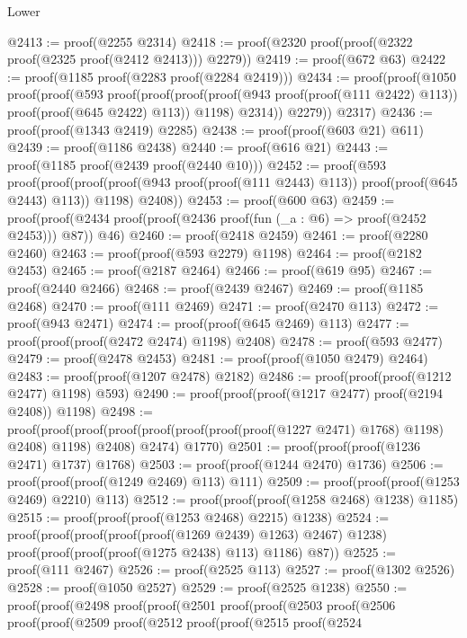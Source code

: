 \begin{lexlean}{Lower}
\begin{coremodule}
@2413 := proof(@2255 @2314)
@2418 := proof(@2320 proof(proof(@2322 proof(@2325 proof(@2412 @2413))) @2279))
@2419 := proof(@672 @63)
@2422 := proof(@1185 proof(@2283 proof(@2284 @2419)))
@2434 := proof(proof(@1050
        proof(proof(@593
              proof(proof(proof(proof(@943 proof(proof(@111 @2422) @113))
                      proof(proof(@645 @2422) @113))
                    @1198)
                  @2314))
            @2279))
      @2317)
@2436 := proof(proof(@1343 @2419) @2285)
@2438 := proof(proof(@603 @21) @611)
@2439 := proof(@1186 @2438)
@2440 := proof(@616 @21)
@2443 := proof(@1185 proof(@2439 proof(@2440 @10)))
@2452 := proof(@593
      proof(proof(proof(proof(@943 proof(proof(@111 @2443) @113)) proof(proof(@645 @2443) @113))
            @1198)
          @2408))
@2453 := proof(@600 @63)
@2459 := proof(proof(@2434 proof(proof(@2436 proof(fun (_a : @6) => proof(@2452 @2453))) @87)) @46)
@2460 := proof(@2418 @2459)
@2461 := proof(@2280 @2460)
@2463 := proof(proof(@593 @2279) @1198)
@2464 := proof(@2182 @2453)
@2465 := proof(@2187 @2464)
@2466 := proof(@619 @95)
@2467 := proof(@2440 @2466)
@2468 := proof(@2439 @2467)
@2469 := proof(@1185 @2468)
@2470 := proof(@111 @2469)
@2471 := proof(@2470 @113)
@2472 := proof(@943 @2471)
@2474 := proof(proof(@645 @2469) @113)
@2477 := proof(proof(proof(@2472 @2474) @1198) @2408)
@2478 := proof(@593 @2477)
@2479 := proof(@2478 @2453)
@2481 := proof(proof(@1050 @2479) @2464)
@2483 := proof(proof(@1207 @2478) @2182)
@2486 := proof(proof(proof(@1212 @2477) @1198) @593)
@2490 := proof(proof(proof(@1217 @2477) proof(@2194 @2408)) @1198)
@2498 := proof(proof(proof(proof(proof(proof(proof(proof(@1227 @2471) @1768) @1198) @2408) @1198)
          @2408)
        @2474)
      @1770)
@2501 := proof(proof(proof(@1236 @2471) @1737) @1768)
@2503 := proof(proof(@1244 @2470) @1736)
@2506 := proof(proof(proof(@1249 @2469) @113) @111)
@2509 := proof(proof(proof(@1253 @2469) @2210) @113)
@2512 := proof(proof(proof(@1258 @2468) @1238) @1185)
@2515 := proof(proof(proof(@1253 @2468) @2215) @1238)
@2524 := proof(proof(proof(proof(proof(@1269 @2439) @1263) @2467) @1238)
      proof(proof(proof(proof(@1275 @2438) @113) @1186) @87))
@2525 := proof(@111 @2467)
@2526 := proof(@2525 @113)
@2527 := proof(@1302 @2526)
@2528 := proof(@1050 @2527)
@2529 := proof(@2525 @1238)
@2550 := proof(proof(@2498
        proof(proof(@2501
              proof(proof(@2503
                    proof(@2506
                        proof(proof(@2509
                              proof(@2512
                                  proof(proof(@2515
                                        proof(@2524

\end{coremodule}
\end{lexlean}
